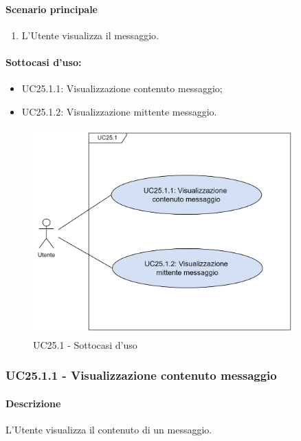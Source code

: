 \paragraph*{Scenario principale}
\begin{enumerate}
  \item L'Utente visualizza il messaggio.
\end{enumerate}

\paragraph*{Sottocasi d'uso:}
\begin{itemize}
  \item UC25.1.1: Visualizzazione contenuto messaggio;
  \item UC25.1.2: Visualizzazione mittente messaggio.
\end{itemize}

\begin{figure}[H]
  \centering
  \includegraphics[width=0.90\textwidth]{assets/uc25_1.png}
  \caption{UC25.1 - Sottocasi d'uso}
\end{figure}


\subsubsection{UC25.1.1 - Visualizzazione contenuto messaggio}\label{UC25point1point1}
\paragraph*{Descrizione}
L'Utente visualizza il contenuto di un messaggio. 


